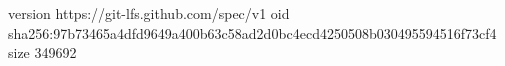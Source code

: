 version https://git-lfs.github.com/spec/v1
oid sha256:97b73465a4dfd9649a400b63c58ad2d0bc4ecd4250508b030495594516f73cf4
size 349692
